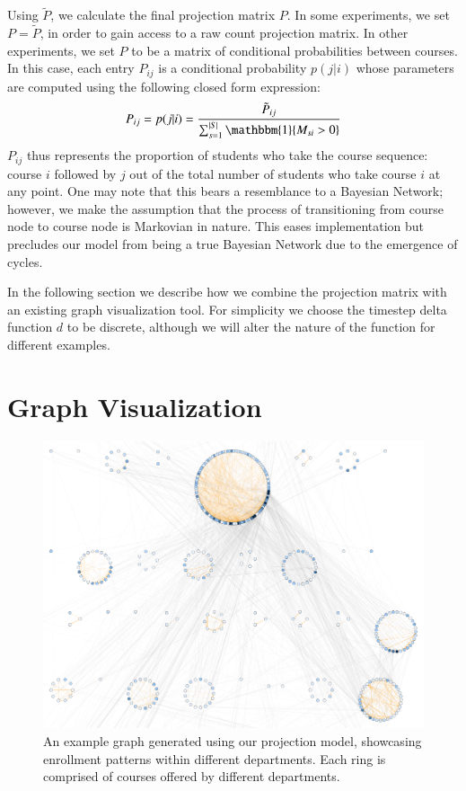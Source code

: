 \documentclass{sigchi}
\begin{document}
Using $\tilde{P}$, we calculate the final projection matrix $P$. In some experiments, we set $P = \tilde{P}$, in order to gain access to a raw count projection matrix. In other experiments, we set $P$ to be a matrix of conditional probabilities between courses. In this case, each entry $P_{ij}$ is a conditional probability $p(j|i)$ whose parameters are computed using the following closed form expression:
\begin{equation}
    P_{ij} = p(j|i) = \frac{\tilde{P}_{ij}}{\sum_{s=1}^{|S|}\mathbbm{1}\{M_{si} > 0\}}
\end{equation}
$P_{ij}$ thus represents the proportion of students who take the
course sequence: course $i$ followed by $j$ out of the total number of
students who take course $i$ at any point. One may note that this
bears a resemblance to a Bayesian Network; however, we make the
assumption that the process of transitioning from course node to
course node is Markovian in nature. This eases implementation but
precludes our model from being a true Bayesian Network due to the
emergence of cycles.

In the following section we describe how we combine the projection
matrix with an existing graph visualization tool. For simplicity we
choose the timestep delta function $d$ to be discrete, although we
will alter the nature of the function for different examples.

\section{Graph Visualization}
\label{sec:visualization}

\begin{figure}
    \centering
    \includegraphics[width=\columnwidth]{final-overview.pdf}
    \caption{An example graph generated using our projection model,
      showcasing enrollment patterns within different departments. Each ring is comprised of courses offered by different departments.}
    \label{fig:overview}
\end{figure}
\end{document}
